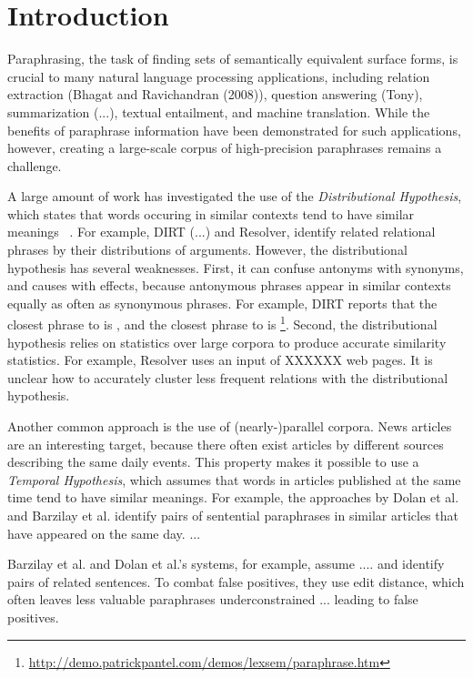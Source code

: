 \section{Introduction}
Paraphrasing, the task of finding sets of semantically equivalent surface forms, is crucial to many 
natural language processing applications, including relation extraction (Bhagat and Ravichandran (2008)), question answering (Tony), summarization (...), textual entailment, and machine translation. While the
benefits of paraphrase information have been demonstrated for such applications, however, 
creating a large-scale corpus of high-precision paraphrases remains a challenge.

A large amount of work has investigated the use of the {\em Distributional Hypothesis}, which states that words occuring in similar contexts tend to have similar meanings ~\cite{bhagat2013paraphrase}. For example, DIRT (...) and Resolver, identify related relational phrases by their distributions of arguments. However, the distributional hypothesis has several weaknesses. First, it can confuse antonyms with synonyms, and causes with effects, because antonymous phrases appear in similar contexts equally as often as synonymous phrases. For example, {\sc DIRT} reports that the closest phrase to  is , and the closest phrase to  is  \footnote{\url{http://demo.patrickpantel.com/demos/lexsem/paraphrase.htm}}. Second, the distributional hypothesis relies on statistics over large corpora to produce accurate similarity statistics. For example, Resolver uses an input of XXXXXX web pages. It is unclear how to accurately cluster less frequent relations with the distributional hypothesis.

Another common approach is the use of (nearly-)parallel corpora. News articles are an interesting target, because there often exist articles by different sources describing the same daily events. This property makes it possible to use a {\em Temporal Hypothesis}, which assumes that words in articles published at the same time tend to have similar meanings. For example, the approaches by Dolan et al. and Barzilay et al. identify pairs of sentential paraphrases in similar articles that have appeared on the same day. ...



Barzilay et al. and Dolan et al.'s systems,
for example, assume  ....
and identify pairs of related sentences. 
To combat false positives, they use edit distance, which often leaves less valuable paraphrases
underconstrained ... leading to false positives.


